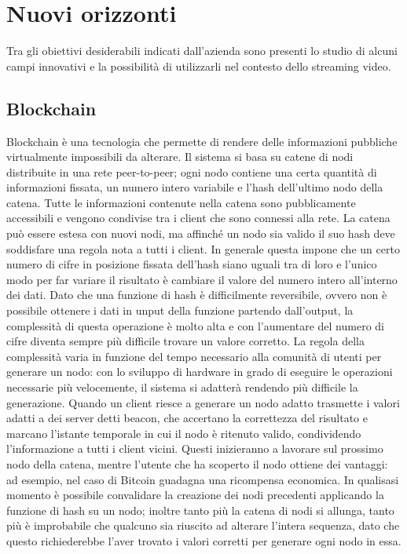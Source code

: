 \section{Nuovi orizzonti}
Tra gli obiettivi desiderabili indicati dall'azienda sono presenti lo studio di alcuni campi innovativi e la possibilità di utilizzarli nel contesto dello streaming video.

	\subsection{Blockchain}
	Blockchain è una tecnologia che permette di rendere delle informazioni pubbliche virtualmente impossibili da alterare. Il sistema si basa su catene di nodi distribuite in una rete peer-to-peer; ogni nodo contiene una certa quantità di informazioni fissata, un numero intero variabile e l'hash dell'ultimo nodo della catena. Tutte le informazioni contenute nella catena sono pubblicamente accessibili e vengono condivise tra i client che sono connessi alla rete. La catena può essere estesa con nuovi nodi, ma affinché un nodo sia valido il suo hash deve soddisfare una regola nota a tutti i client. In generale questa impone che un certo numero di cifre in posizione fissata dell'hash siano uguali tra di loro e l'unico modo per far variare il risultato è cambiare il valore del numero intero all'interno dei dati. Dato che una funzione di hash è difficilmente reversibile, ovvero non è possibile ottenere i dati in unput della funzione partendo dall'output, la complessità di questa operazione è molto alta e con l'aumentare del numero di cifre diventa sempre più difficile trovare un valore corretto. La regola della complessità varia in funzione del tempo necessario alla comunità di utenti per generare un nodo: con lo sviluppo di hardware in grado di eseguire le operazioni necessarie più velocemente, il sistema si adatterà rendendo più difficile la generazione. Quando un client riesce a generare un nodo adatto trasmette i valori adatti a dei server detti beacon, che accertano la correttezza del risultato e marcano l'istante temporale in cui il nodo è ritenuto valido, condividendo l'informazione a tutti i client vicini. Questi inizieranno a lavorare sul prossimo nodo della catena, mentre l'utente che ha scoperto il nodo ottiene dei vantaggi: ad esempio, nel caso di Bitcoin guadagna una ricompensa economica. In qualisasi momento è possibile convalidare la creazione dei nodi precedenti applicando la funzione di hash su un nodo; inoltre tanto più la catena di nodi si allunga, tanto più è improbabile che qualcuno sia riuscito ad alterare l'intera sequenza, dato che questo richiederebbe l'aver trovato i valori corretti per generare ogni nodo in essa.
